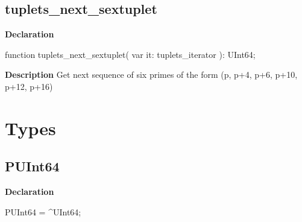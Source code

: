 \documentclass{report}
\newif\ifpdf
\begin{document}
\subsection*{tuplets{\_}next{\_}sextuplet}
\fi
\label{primesieve-tuplets_next_sextuplet}
\begin{list}{}{
\setlength{\itemindent}{0cm}
\setlength{\listparindent}{0cm}
\setlength{\leftmargin}{\evensidemargin}
\addtolength{\leftmargin}{\tmplength}
\settowidth{\labelsep}{X}
\addtolength{\leftmargin}{\labelsep}
\setlength{\labelwidth}{\tmplength}
}
\item[\textbf{Declaration}\hfill]
\ifpdf
\begin{flushleft}
\fi
\begin{ttfamily}
function tuplets{\_}next{\_}sextuplet( var it: tuplets{\_}iterator ): UInt64;\end{ttfamily}

\ifpdf
\end{flushleft}
\fi

\par
\item[\textbf{Description}]
Get next sequence of six primes of the form (p, p+4, p+6, p+10, p+12, p+16)

\end{list}
\section{Types}
\ifpdf
\subsection*{\large{\textbf{PUInt64}}\normalsize\hspace{1ex}\hrulefill}
\else
\subsection*{PUInt64}
\fi
\label{primesieve-PUInt64}
\begin{list}{}{
\setlength{\itemindent}{0cm}
\setlength{\listparindent}{0cm}
\setlength{\leftmargin}{\evensidemargin}
\addtolength{\leftmargin}{\tmplength}
\settowidth{\labelsep}{X}
\addtolength{\leftmargin}{\labelsep}
\setlength{\labelwidth}{\tmplength}
}
\item[\textbf{Declaration}\hfill]
\ifpdf
\begin{flushleft}
\fi
\begin{ttfamily}
PUInt64 = {\^{}}UInt64;\end{ttfamily}

\ifpdf
\end{flushleft}
\fi

\end{list}
\ifpdf
\end{document}
